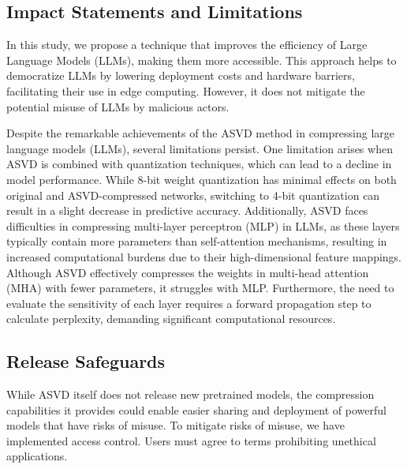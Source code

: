 \subsection{Impact Statements and Limitations}
In this study, we propose a technique that improves the efficiency of Large Language Models (LLMs), making them more accessible. This approach helps to democratize LLMs by lowering deployment costs and hardware barriers, facilitating their use in edge computing. However, it does not mitigate the potential misuse of LLMs by malicious actors.

Despite the remarkable achievements of the ASVD method in compressing large language models (LLMs), several limitations persist. One limitation arises when ASVD is combined with quantization techniques, which can lead to a decline in model performance. While 8-bit weight quantization has minimal effects on both original and ASVD-compressed networks, switching to 4-bit quantization can result in a slight decrease in predictive accuracy. Additionally, ASVD faces difficulties in compressing multi-layer perceptron (MLP) in LLMs, as these layers typically contain more parameters than self-attention mechanisms, resulting in increased computational burdens due to their high-dimensional feature mappings. Although ASVD effectively compresses the weights in multi-head attention (MHA) with fewer parameters, it struggles with MLP. Furthermore, the need to evaluate the sensitivity of each layer requires a forward propagation step to calculate perplexity, demanding significant computational resources. 

\subsection{Release Safeguards}
While ASVD itself does not release new pretrained models, the compression capabilities it provides could enable easier sharing and deployment of powerful models that have risks of misuse. 
To mitigate risks of misuse, we have implemented access control. Users must agree to terms prohibiting unethical applications.

